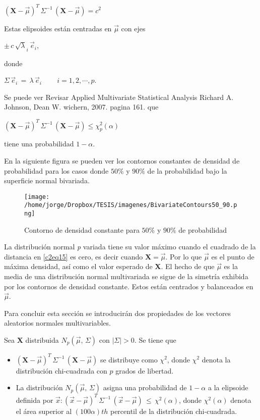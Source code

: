 \documentclass[spanish]{report}
\begin{document}
\vspace{5pt}
$(\textbf{X}-\vec{\mu})^T\,\Sigma^{-1}\,(\textbf{X}-\vec{\mu})=c^2$

\vspace{5pt}
Estas elipsoides están centradas en $\vec{\mu}$ con ejes

\vspace{5pt}
$\pm\,c\,\sqrt{\lambda}_i\,\vec{e}_i$,

\vspace{5pt}
donde

\vspace{5pt}
$\Sigma\,\vec{e}_i\,=\,\lambda\,\vec{e}_i\qquad\,i=1,2,\cdots,p$.

\vspace{5pt}
Se puede ver Revisar Applied Multivariate Statistical Analysis Richard A. Johnson, Dean W. wichern, 2007. pagina 161. que

\vspace{5pt}
$(\textbf{X}-\vec{\mu})^T\,\Sigma^{-1}\,(\textbf{X}-\vec{\mu})\leq \chi^2_p(\alpha)$

\vspace{5pt}
tiene una probabilidad $1-\alpha$.

En la siguiente figura se pueden ver los contornos constantes de densidad de probabilidad para los casos donde $50\%$ y $90\%$ de la probabilidad bajo la superficie normal bivariada.

\begin{figure}[H]
\centering
\texttt{[image: /home/jorge/Dropbox/TESIS/imagenes/BivariateContours50\_90.png]}
\caption{Contorno de densidad constante para $50\%$ y $90\%$ de probabilidad}
\label{c2f5}
\end{figure}
  

La distribución normal \emph{p} variada tiene su valor máximo cuando el cuadrado de la distancia en \ref{c2eq15} es cero, es decir cuando $\textbf{X}=\vec{\mu}$. Por lo que $\vec{\mu}$ es el punto de máxima densidad, así como el valor esperado de \textbf{X}. El hecho de que $\vec{\mu}$ es la media de una distribución normal multivariada se sigue de la simetría exhibida por los contornos de densidad constante. Estos están centrados y balanceados en $\vec{\mu}$.

Para concluir esta sección se introducirán dos propiedades de los vectores aleatorios normales multivariables.

Sea \textbf{X} distribuida $N_p(\vec{\mu},\,\Sigma)$ con $|\Sigma|>0$. Se tiene que 
\begin{itemize}
\item $(\textbf{X}-\vec{\mu})^T\,\Sigma^{-1}\,(\textbf{X}-\vec{\mu})$ se distribuye como $\chi^2$, donde $\chi^2$ denota la distribución chi-cuadrada con $p$ grados de libertad.
\item La distribución $N_p(\vec{\mu},\,\Sigma)$ asigna una probabilidad de $1-\alpha$ a la elipsoide definida por ${\vec{x}:(\vec{x}-\vec{\mu})^T\,\Sigma^{-1}\,(\vec{x}-\vec{\mu})\,\leq\,\chi^2(\alpha)}$, donde $\chi^2(\alpha)$ denota el área superior al $(100\alpha)th$ percentil de la distribución chi-cuadrada.
\end{itemize} 
\end{document}
